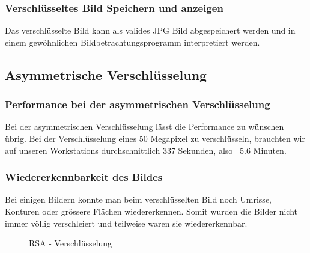 \documentclass[paper=a4,fontsize=12pt]{scrartcl}
\begin{document}
\subsubsection{Verschlüsseltes Bild Speichern und anzeigen}
Das verschlüsselte Bild kann als valides JPG Bild abgespeichert werden und in einem
gewöhnlichen Bildbetrachtungsprogramm interpretiert werden.
 
\newpage
\subsection{Asymmetrische Verschlüsselung}
\subsubsection{Performance bei der asymmetrischen Verschlüsselung}
Bei der asymmetrischen Verschlüsselung lässt die Performance zu wünschen übrig.
Bei der Verschlüsselung eines 50 Megapixel zu verschlüsseln, brauchten wir auf unseren
Workstations durchschnittlich 337 Sekunden, also ~5.6 Minuten.
\subsubsection{Wiedererkennbarkeit des Bildes}
 Bei einigen Bildern konnte man beim verschlüsselten Bild noch Umrisse, Konturen oder grössere
 Flächen wiedererkennen.
 Somit wurden die Bilder nicht immer völlig verschleiert und teilweise waren sie wiedererkennbar.
 \begin{figure}[H] 
	\centering
	\caption[RSA - Verschlüsselung]{RSA - Verschlüsselung}  
	\label{asym-enc-result} 
\end{figure}
\end{document}
